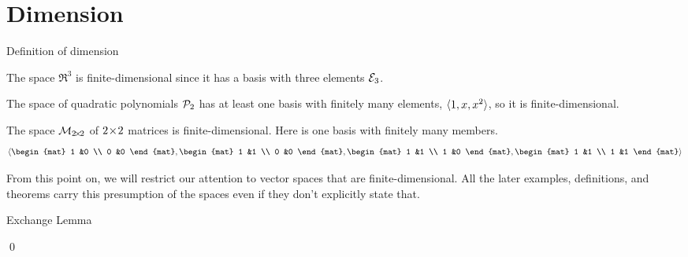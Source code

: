 \documentclass[10pt,t,serif,professionalfont]{beamer}
\begin{document}
\section{Dimension}
\begin{frame}{Definition of dimension}
\df[df:FiniteDimensional]

\medskip
\ex
The space 
$\Re^3$
is finite-dimensional since it has a basis with three elements ${\cal E}_3$.

\pause
\ex
The space of quadratic polynomials $\mathcal{P}_2$ has at least one
basis with finitely many elements, $\langle1,x,x^2\rangle$, so it is
finite-dimensional. 

\pause
\ex
The space $\mathcal{M}_{2 \! \times \! 2}$ of $2 \! \times \! 2$ matrices is finite-dimensional.
Here is one basis with finitely many members.
\begin{equation*}
  \sequence{
    \begin{mat}
      1 &0 \\
      0 &0
    \end{mat},
    \begin{mat}
      1 &1 \\
      0 &0
    \end{mat},
    \begin{mat}
      1 &1 \\
      1 &0
    \end{mat},
    \begin{mat}
      1 &1 \\
      1 &1
    \end{mat}
        }
\end{equation*}

\pause
\no
From this point on, we will restrict our attention to 
vector spaces that are finite-dimensional.
All the later examples, definitions, and theorems
carry this presumption of the spaces
even if they don't explicitly state that.
\end{frame}



\begin{frame}{Exchange Lemma}
\lm[lm:ExchangeLemma]

\pause
\pf
{}
\end{frame}
\begin{frame}
\qed
\end{frame}
\end{document}
